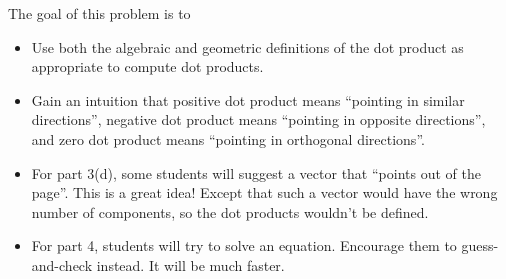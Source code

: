 \documentclass{problemset}
\begin{document}

	\question
	\begin{annotation}
		\begin{goals}

			The goal of this problem is to
			\begin{itemize}
				\item Use both the algebraic and geometric definitions of the dot product
					as appropriate to compute dot products.
				\item Gain an intuition that positive dot product
					means ``pointing in similar directions'', negative dot product
					means ``pointing in opposite directions'', and zero dot product
					means ``pointing in orthogonal directions''.
			\end{itemize}
		\end{goals}

		\begin{notes}
			\begin{itemize}
				\item For part 3(d), some students will suggest a vector
					that ``points out of the page''. This is a great idea!
					Except that such a vector would have the wrong number of components,
					so the dot products wouldn't be defined.
				\item For part 4, students will try to solve an equation. Encourage them
					to guess-and-check instead. It will be much faster.
			\end{itemize}
		\end{notes}
	\end{annotation}
\end{document}

